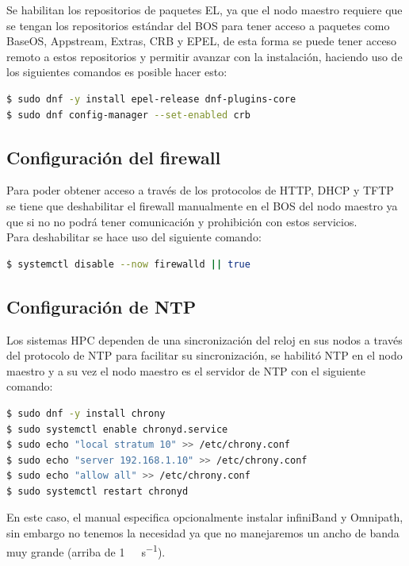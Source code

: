 Se habilitan los repositorios de paquetes EL, ya que el nodo maestro requiere que se tengan los repositorios estándar del BOS para tener acceso a paquetes como BaseOS, Appstream, Extras, CRB y EPEL, de esta forma se puede tener acceso remoto a estos repositorios y permitir avanzar con la instalación, haciendo uso de los siguientes comandos es posible hacer esto:

\begin{lstlisting}[language=bash, caption={Comandos para habilitar paquetes EL}, label={lst:epel}]
$ sudo dnf -y install epel-release dnf-plugins-core
$ sudo dnf config-manager --set-enabled crb
\end{lstlisting}

\subsection{Configuración del firewall}
Para poder obtener acceso a través de los protocolos de HTTP, DHCP y TFTP se tiene que deshabilitar el firewall manualmente en el BOS del nodo maestro ya que si no no podrá tener comunicación y prohibición con estos servicios.
\\[1em]
Para deshabilitar se hace uso del siguiente comando:
\begin{lstlisting}[language=bash, caption={Comando para desactivación de firewall}, label={lst:firewall}]
$ systemctl disable --now firewalld || true
\end{lstlisting}
\subsection{Configuración de NTP}
Los sistemas HPC dependen de una sincronización del reloj en sus nodos a través del protocolo de NTP para facilitar su sincronización, se habilitó NTP en el nodo maestro y a su vez el nodo maestro es el servidor de NTP con el siguiente comando:

\begin{lstlisting}[language=bash, caption={Comandos para configurar el servidor NTP}, label={lst:ntp}]
$ sudo dnf -y install chrony
$ sudo systemctl enable chronyd.service
$ sudo echo "local stratum 10" >> /etc/chrony.conf
$ sudo echo "server 192.168.1.10" >> /etc/chrony.conf
$ sudo echo "allow all" >> /etc/chrony.conf
$ sudo systemctl restart chronyd 
\end{lstlisting}
En este caso, el manual especifica opcionalmente instalar infiniBand y Omnipath, sin embargo no tenemos la necesidad ya que no manejaremos un ancho de banda muy grande (arriba de \SI{1}{\giga\bit\per\second}).

